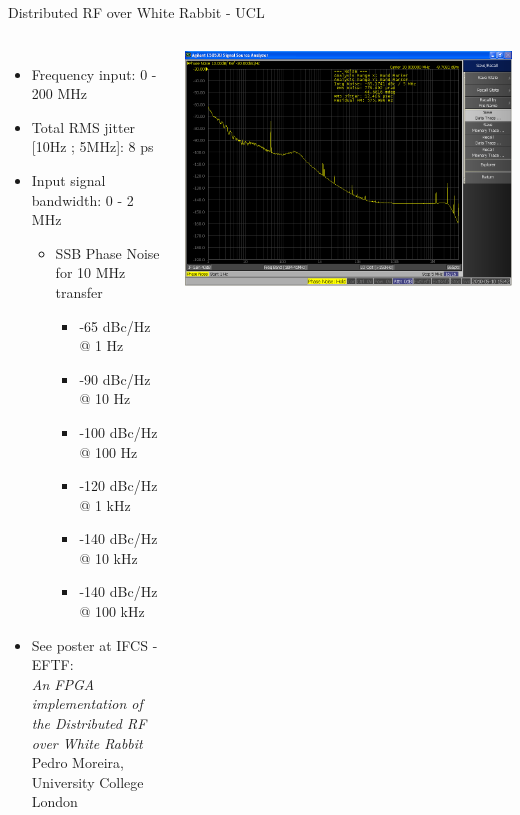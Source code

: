 \documentclass[compress,red]{beamer}
\begin{document}
\begin{frame}{Distributed RF over White Rabbit - UCL}
  \begin{columns}[c]
      \begin{itemize}
	\item Frequency input: 0 - 200 MHz
	\item Total RMS jitter [10Hz ; 5MHz]: 8 ps
	\item Input signal bandwidth: 0 - 2 MHz
	\begin{itemize}
	  \item SSB Phase Noise for 10 MHz transfer
	  \begin{itemize}
		\item    -65 dBc/Hz @ 1 Hz
		\item  -90 dBc/Hz @ 10 Hz
		\item -100 dBc/Hz @ 100 Hz
		\item -120 dBc/Hz @ 1 kHz
		\item  -140 dBc/Hz @ 10 kHz
		\item -140 dBc/Hz @ 100 kHz
	  \end{itemize}
	\end{itemize}
	\item  See poster at IFCS - EFTF: \\
		\emph{An FPGA implementation of the Distributed RF over White Rabbit} \\
		Pedro Moreira, University College London 
      \end{itemize}
      \begin{center}
	\includegraphics[width=1.0\textwidth]{../../figures/applications/rx_10MHz_CsClock_pedro.png}

\end{center}
\end{columns}
\end{frame}
\end{document}

